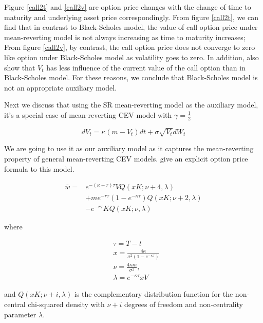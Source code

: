 Figure \ref{call2t} and \ref{call2v} are option price changes with the change of time to maturity and underlying asset price correspondingly. From figure \ref{call2t}, we can find that in contrast to Black-Scholes model, the value of call option price under mean-reverting model is not always increasing as time to maturity increases; From figure \ref{call2v}, by contrast, the call option price does not converge to zero like option under Black-Scholes model as volatility goes to zero. In addition, \cite{grunbichler_valuing_1996} also show that $V_t$ has less influence of the current value of the call option than in Black-Scholes model. For these reasons, we conclude that Black-Scholes model is not an appropriate auxiliary model.

Next we discuss that using the SR mean-reverting model as the auxiliary model, it's a special case of mean-reverting CEV model with $\gamma=\frac{1}{2}$

\begin{equation}
    d V_t=\kappa(m - V_t) d t+\sigma \sqrt{V_t} d W_t
\end{equation}

\noindent We are going to use it as our auxiliary model as it captures the mean-reverting property of general mean-reverting CEV models. \cite{grunbichler_valuing_1996} give an explicit option price formula to this model.

\begin{equation}\label{aux call price}
    \begin{aligned}
        \bar{w}=&  e^{ -(\kappa+r) \tau} V Q(x K ; \nu+4, \lambda) \\
        &+ m e^{-r \tau}(1-e^{-\kappa \tau}) Q(xK ; \nu+2, \lambda) \\
        &-e^{-r \tau} K Q(x K; \nu, \lambda)
        \end{aligned}
\end{equation}

\noindent where

$$
\begin{aligned}\label{para}
    & \tau = T-t\\
    &x=\frac{4 \kappa}{\sigma^{2}(1-e^{-\kappa \tau})} \\
    &\nu=\frac{4 \kappa m}{\sigma^{2}}, \\
    &\lambda= e^{-\kappa \tau}x V
\end{aligned}
$$

\noindent and $Q(xK ; \nu+i, \lambda)$ is the complementary distribution function for the non-central chi-squared density with $\nu + i$ degrees of freedom and non-centrality parameter $\lambda$.

